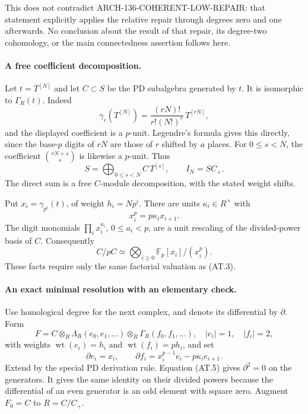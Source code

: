 This does not contradict ARCH-136-COHERENT-LOW-REPAIR: that
statement explicitly applies the relative repair through
degrees zero and one afterwards. No conclusion about the
result of that repair, its degree-two cohomology, or the main
connectedness assertion follows here.

\paragraph{A free coefficient decomposition.}
Let \(t=T^{[N]}\) and let \(C\subset S\) be the PD
subalgebra generated by \(t\). It is isomorphic to
\(\Gamma_R(t)\). Indeed
\[
 \gamma_r(T^{[N]})=
       \frac{(rN)!}{r!(N!)^r}\,T^{[rN]},                 \tag{AT.3}
\]
and the displayed coefficient is a \(p\)-unit. Legendre's
formula gives this directly, since the base-\(p\) digits of
\(rN\) are those of \(r\) shifted by \(a\) places.
For \(0\leq s<N\), the coefficient
\(\binom{rN+s}{s}\) is likewise a \(p\)-unit. Thus
\[
 S=\bigoplus_{0\leq s<N} C\,T^{[s]},\qquad
                         I_N=S C_+.                    \tag{AT.4}
\]
The direct sum is a free \(C\)-module decomposition, with
the stated weight shifts.

Put \(x_i=\gamma_{p^i}(t)\), of weight \(h_i=Np^i\).
There are units \(\kappa_i\in R^\times\) with
\[
                 x_i^p=p\kappa_i x_{i+1}.               \tag{AT.5}
\]
The digit monomials \(\prod_i x_i^{a_i}\),
\(0\leq a_i<p\), are a unit rescaling of the divided-power
basis of \(C\). Consequently
\[
 C/pC\simeq\bigotimes_{i\geq0}
                   \mathbb F_p[x_i]/(x_i^p).             \tag{AT.6}
\]
These facts require only the same factorial valuation as (AT.3).

\paragraph{An exact minimal resolution with an elementary check.}
Use homological degree for the next complex, and denote its
differential by \(\partial\). Form
\[
 F=C\otimes_R\Lambda_R(e_0,e_1,\ldots)
                   \otimes_R\Gamma_R(f_0,f_1,\ldots),
 \quad |e_i|=1,\quad |f_i|=2,
                                                               \tag{AT.7}
\]
with weights \(\operatorname{wt}(e_i)=h_i\) and
\(\operatorname{wt}(f_i)=p h_i\), and set
\[
 \partial e_i=x_i,
 \qquad
 \partial f_i=x_i^{p-1}e_i-p\kappa_i e_{i+1}.            \tag{AT.8}
\]
Extend by the special PD derivation rule. Equation (AT.5)
gives \(\partial^2=0\) on the generators. It gives the
same identity on their divided powers because the differential
of an even generator is an odd element with square zero.
Augment \(F_0=C\) to \(R=C/C_+\).

